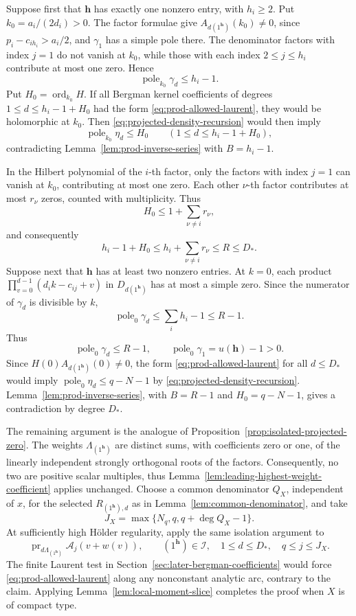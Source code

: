 \documentclass[11pt,reqno]{amsart}
\theoremstyle{corollary}
\theoremstyle{conjecture}
\theoremstyle{assumption}
\theoremstyle{proposition}
\theoremstyle{remark}
\numberwithin{equation}{section}
\begin{document}
Suppose first that $\mathbf h$ has exactly one nonzero entry, with $h_i\geq 2$. Put $k_0=a_i/(2d_i)>0$. The factor formulae give $A_{d(1^{\mathbf h})}(k_0)\neq 0$, since $p_i-c_{i h_i}>a_i/2$, and $\gamma_1$ has a simple pole there. The denominator factors with index $j=1$ do not vanish at $k_0$, while those with each index $2\leq j\leq h_i$ contribute
at most one zero. Hence
\[
\operatorname{pole}_{k_0}\gamma_d\leq h_i-1.
\]
Put $H_0=\operatorname{ord}_{k_0}H$. If all Bergman kernel coefficients of degrees $1\leq d\leq h_i-1+H_0$ had the form \eqref{eq:prod-allowed-laurent}, they would be holomorphic at $k_0$. Then \eqref{eq:projected-density-recursion} would then imply
\[
\operatorname{pole}_{k_0}\eta_d\leq H_0\qquad (1\leq d\leq h_i-1+H_0),
\]
contradicting Lemma~\ref{lem:prod-inverse-series} with $B=h_i-1$.

In the Hilbert polynomial of the $i$-th factor, only the factors with index $j=1$ can vanish at $k_0$, contributing at most one zero. Each other $\nu$-th factor contributes at most $r_\nu$ zeros, counted with multiplicity. Thus
\[
H_0\leq1+\sum_{\nu\neq i}r_\nu,
\]
and consequently
\[
h_i-1+H_0\leq h_i+\sum_{\nu\neq i}r_\nu\leq R\leq D_*.
\]
Suppose next that $\mathbf h$ has at least two nonzero entries. At $k=0$, each product $\prod_{v=0}^{d-1}(d_i k-c_{ij}+v)$ in $D_{d(1^{\mathbf h})}$ has at most a simple zero. Since the numerator of $\gamma_d$ is divisible by $k$,
\[
\operatorname{pole}_0\gamma_d\leq\sum_i h_i-1\leq R-1.
\] 
Thus
\[
\operatorname{pole}_0\gamma_d\leq R-1,\qquad \operatorname{pole}_0\gamma_1=u(\mathbf h)-1>0.
\]
Since $H(0)A_{d(1^{\mathbf h})}(0)\neq 0$, the form \eqref{eq:prod-allowed-laurent} for all $d\leq D_*$ would imply $\operatorname{pole}_0\eta_d\leq q-N-1$ by \eqref{eq:projected-density-recursion}. Lemma~\ref{lem:prod-inverse-series}, with $B=R-1$ and $H_0=q-N-1$, gives a contradiction by degree $D_*$.

The remaining argument is the analogue of Proposition~\ref{prop:isolated-projected-zero}. The weights $\Lambda_{(1^{\mathbf h})}$ are distinct sums, with coefficients zero or one, of the linearly independent strongly orthogonal roots of the factors. Consequently, no two are positive scalar multiples, thus Lemma~\ref{lem:leading-highest-weight-coefficient} applies unchanged. Choose a common denominator $Q_X$, independent of $x$, for the selected $R_{(1^{\mathbf h}),d}$ as in Lemma~\ref{lem:common-denominator}, and take
\[
 J_X=\max\{N_q,q,q+\deg Q_X-1\}.
\]
At sufficiently high H\"older regularity, apply the same isolation argument
to
\[
 \operatorname{pr}_{d\Lambda_{(1^{\mathbf h})}}\mathcal A_j(v+w(v)),\qquad (1^{\mathbf h})\in\mathcal I,\quad 1\leq d\leq D_*, \quad q\leq j\leq J_X.
\]
The finite Laurent test in Section~\ref{sec:later-bergman-coefficients} would force \eqref{eq:prod-allowed-laurent} along any nonconstant analytic arc, contrary to the claim. Applying Lemma~\ref{lem:local-moment-slice} completes the proof when $X$ is of compact type.
\end{document}
